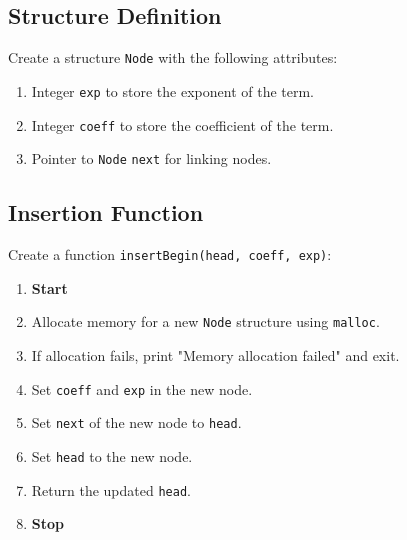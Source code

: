  {\selectfont

  \subsection{Structure Definition}
  Create a structure \texttt{Node} with the following attributes:
  \begin{enumerate}[label=\arabic*:,left=0pt]
    \item Integer \texttt{exp} to store the exponent of the term.
    \item Integer \texttt{coeff} to store the coefficient of the term.
    \item Pointer to \texttt{Node} \texttt{next} for linking nodes.
  \end{enumerate}

  \subsection{Insertion Function}
  Create a function \texttt{insertBegin(head, coeff, exp)}:
  \begin{enumerate}[label=\arabic*:,left=0pt]
    \item \textbf{Start}
    \item Allocate memory for a new \texttt{Node} structure using \texttt{malloc}.
    \item If allocation fails, print "Memory allocation failed" and exit.
    \item Set \texttt{coeff} and \texttt{exp} in the new node.
    \item Set \texttt{next} of the new node to \texttt{head}.
    \item Set \texttt{head} to the new node.
    \item Return the updated \texttt{head}.
    \item \textbf{Stop}
  \end{enumerate}

}
